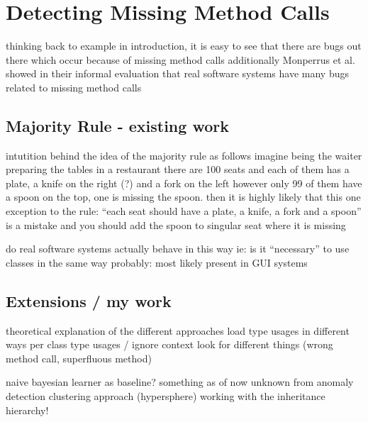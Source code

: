 \chapter{Detecting Missing Method Calls}

thinking back to example in introduction, it is easy to see that there are bugs out there which occur because of missing method calls
additionally Monperrus et al. showed in their informal evaluation that real software systems have many bugs related to missing method calls


\section{Majority Rule - existing work}
intutition behind the idea of the majority rule as follows
imagine being the waiter preparing the tables in a restaurant
there are 100 seats and each of them has a plate, a knife on the right (?) and a fork on the left
however only 99 of them have a spoon on the top,
one is missing the spoon.
then it is highly likely that this one exception to the rule: ``each seat should have a plate, a knife, a fork and a spoon'' is a mistake
and you should add the spoon to singular seat where it is missing





do real software systems actually behave in this way
ie: is it ``necessary'' to use classes in the same way
probably: most likely present in GUI systems

\section{Extensions / my work}
theoretical explanation of the different approaches
    load type usages in different ways
        per class type usages / ignore context
    look for different things (wrong method call, superfluous method)

    naive bayesian learner as baseline?
    something as of now unknown from anomaly detection
    clustering approach (hypersphere)
    working with the inheritance hierarchy!


